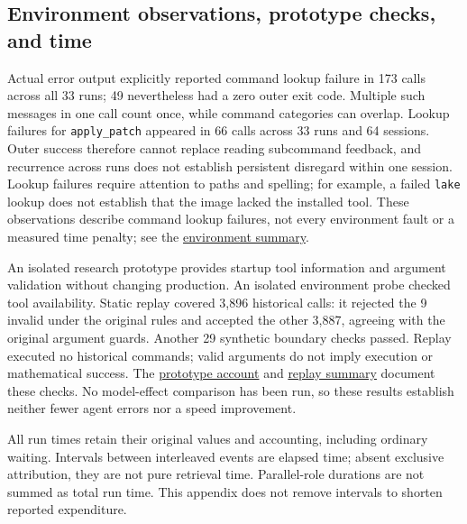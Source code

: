 \subsection[Environment observations, prototype checks, and time]{\texorpdfstring{\protect\hypertarget{s4}{}Environment observations, prototype checks, and time}{Environment observations, prototype checks, and time}}
Actual error output explicitly reported command lookup failure in 173 calls across all 33 runs; 49 nevertheless had a zero outer exit code. Multiple such messages in one call count once, while command categories can overlap. Lookup failures for \nolinkurl{apply_patch} appeared in 66 calls across 33 runs and 64 sessions. Outer success therefore cannot replace reading subcommand feedback, and recurrence across runs does not establish persistent disregard within one session. Lookup failures require attention to paths and spelling; for example, a failed \nolinkurl{lake} lookup does not establish that the image lacked the installed tool. These observations describe command lookup failures, not every environment fault or a measured time penalty; see the \href{research/analysis/environment_summary.json}{environment summary}.

An isolated research prototype provides startup tool information and argument validation without changing production. An isolated environment probe checked tool availability. Static replay covered 3,896 historical calls: it rejected the 9 invalid under the original rules and accepted the other 3,887, agreeing with the original argument guards. Another 29 synthetic boundary checks passed. Replay executed no historical commands; valid arguments do not imply execution or mathematical success. The \href{research/interventions/README.zh-CN.md}{prototype account} and \href{research/interventions/argument_replay/summary.json}{replay summary} document these checks. No model-effect comparison has been run, so these results establish neither fewer agent errors nor a speed improvement.

All run times retain their original values and accounting, including ordinary waiting. Intervals between interleaved events are elapsed time; absent exclusive attribution, they are not pure retrieval time. Parallel-role durations are not summed as total run time. This appendix does not remove intervals to shorten reported expenditure.

